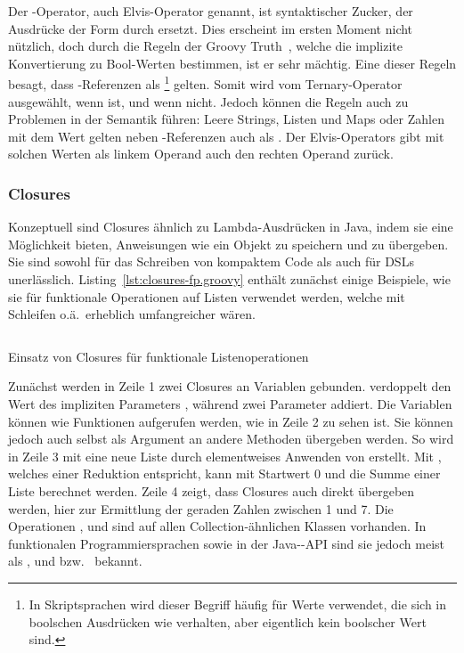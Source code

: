 \documentclass[a4paper]{article}
\newcommand{\codelisting}[3]{\begin{listing}[htp]
	\inputminted{#1}{#1/#2}
	\vspace{-3ex}
	\caption{#3}
	\label{lst:#2}
\end{listing}}
\begin{document}
Der -Operator, auch Elvis-Operator genannt, ist syntaktischer Zucker, der Ausdrücke der Form  durch  ersetzt.
Dies erscheint im ersten Moment nicht nützlich, doch durch die Regeln der Groovy Truth~\cite[Abs.~1.6.5.]{groovy-lang:documentation}, welche die implizite Konvertierung zu Bool-Werten bestimmen, ist er sehr mächtig.
Eine dieser Regeln besagt, dass -Referenzen als \footnote{In Skriptsprachen wird dieser Begriff häufig für Werte verwendet, die sich in boolschen Ausdrücken wie  verhalten, aber eigentlich kein boolscher Wert sind.} gelten.
Somit wird  vom Ternary-Operator ausgewählt, wenn   ist, und  wenn nicht.
Jedoch können die Regeln auch zu Problemen in der Semantik führen:
Leere Strings, Listen und Maps oder Zahlen mit dem Wert  gelten neben -Referenzen auch als .
Der Elvis-Operators gibt mit solchen Werten als linkem Operand auch den rechten Operand zurück.

\subsubsection{Closures}\label{subsubsec:closures}

Konzeptuell sind Closures ähnlich zu Lambda-Ausdrücken in Java, indem sie eine Möglichkeit bieten, Anweisungen wie ein Objekt zu speichern und zu übergeben.
Sie sind sowohl für das Schreiben von kompaktem Code als auch für DSLs unerlässlich.
Listing~\ref{lst:closures-fp.groovy} enthält zunächst einige Beispiele, wie sie für funktionale Operationen auf Listen verwendet werden, welche mit Schleifen o.ä.~erheblich umfangreicher wären.

\codelisting{groovy}{closures-fp.groovy}{Einsatz von Closures für funktionale Listenoperationen}

Zunächst werden in Zeile 1 zwei Closures an Variablen gebunden.
 verdoppelt den Wert des impliziten Parameters , während  zwei Parameter addiert.
Die Variablen können wie Funktionen aufgerufen werden, wie in Zeile 2 zu sehen ist.
Sie können jedoch auch selbst als Argument an andere Methoden übergeben werden.
So wird in Zeile 3 mit  eine neue Liste durch elementweises Anwenden von  erstellt.
Mit , welches einer Reduktion entspricht, kann mit Startwert 0 und  die Summe einer Liste berechnet werden.
Zeile 4 zeigt, dass Closures auch direkt übergeben werden, hier zur Ermittlung der geraden Zahlen zwischen 1 und 7.
Die Operationen ,  und  sind auf allen Collection-ähnlichen Klassen vorhanden.
In funktionalen Programmiersprachen sowie in der Java--API sind sie jedoch meist als ,  und  bzw.~ bekannt.
\end{document}
